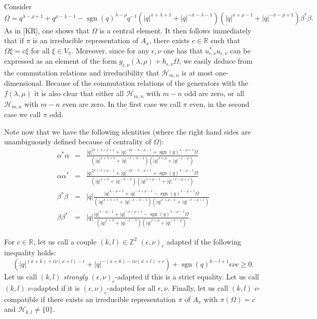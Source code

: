 \documentclass[12pt]{article}
\theoremstyle{change}
\DeclareMathOperator{\sgn}{\mathrm{sgn}}
\newcommand{\R}{\mathbb{R}}
\newcommand{\Z}{\mathbb{Z}}
\newcommand{\Hsp}{\mathscr{H}}
\theoremstyle{definition}
\numberwithin{equation}{section}
\begin{document}
Consider \[\Omega =q^{\lambda-\rho+1}+q^{\rho-\lambda-1} - \sgn(q)^{\lambda-\rho}q^{-1}(|q|^{x+\lambda+1}+|q|^{-x-\lambda-1})(|q|^{x+\rho-1}+|q|^{-x-\rho+1})\beta^*\beta.\] As in [KR], one shows that $\Omega$ is a central element. It then follows immediately that if $\pi$ is an irreducible representation of $A_x$, there exists $c\in \R$ such that $\Omega\xi = c\xi$ for all $\xi \in V_{\pi}$. Moreover, since for any $\epsilon,\nu$ one has that $u_{\epsilon,\nu}^*u_{\epsilon,\nu}$ can be expressed as an element of the form $g_{\epsilon,\nu}(\lambda,\rho) + h_{\epsilon,\nu}\Omega$, we easily deduce from the commutation relations and irreducibility that $\Hsp_{m,n}$ is at most one-dimensional. Because of the commutation relations of the generators with the $f(\lambda,\mu)$ it is also clear that either all $\Hsp_{m,n}$ with $m-n$ odd are zero, or all $\Hsp_{m,n}$ with $m-n$ even are zero. In the first case we call $\pi$ even, in the second case we call $\pi$ odd. 


Note now that we have the following identities (where the right hand sides are unambiguously defined because of centrality of $\Omega$): 
\begin{eqnarray*}
\alpha^*\alpha &=& \frac{|q|^{2x+\lambda+\rho+1}+|q|^{-2x-\lambda-\rho-1}+\sgn(q)^{\lambda-\rho+1}\Omega}{(|q|^{x+\lambda+1}+|q|^{-x-\lambda-1})(|q|^{x+\rho}+|q|^{-x-\rho})}\\
\alpha\alpha^* &=& \frac{|q|^{2x+\lambda+\rho-1}+|q|^{-2x-\lambda-\rho+1}+\sgn(q)^{\lambda-\rho-1}\Omega}{(|q|^{x+\lambda}+|q|^{-x-\lambda})(|q|^{x+\rho-1}+|q|^{-x-\rho+1})}\\
\beta^*\beta &=& |q|\frac{|q|^{\lambda-\rho+1}+|q|^{-\lambda+\rho-1}-\sgn(q)^{\lambda-\rho+1}\Omega}{(|q|^{x+\lambda+1}+|q|^{-x-\lambda-1})(|q|^{x+\rho-1}+|q|^{-x-\rho+1})}\\
\beta\beta^* &=&  |q|\frac{|q|^{\lambda-\rho-1}+|q|^{-\lambda+\rho+1}-\sgn(q)^{\lambda-\rho-1}\Omega}{(|q|^{x+\lambda}+|q|^{-x-\lambda})(|q|^{x+\rho}+|q|^{-x-\rho})}.
\end{eqnarray*}

For $c\in\R$, let us call a couple $(k,l)\in \Z^2$ $(\epsilon,\nu)_c$ adapted if the following inequality holds: \begin{equation}\label{EqAd}(|q|^{(x+k)+\epsilon\nu(x+l)-\epsilon}+|q|^{-(x+k)-\epsilon\nu(x+l)+\epsilon})+\sgn(q)^{k-l+1}\epsilon\nu c\geq 0.\end{equation} Let us call $(k,l)$ \emph{strongly} $(\epsilon,\nu)_c$-adapted if this is a strict equality. Let us call $(k,l)$ $c$-adapted if it is $(\epsilon,\nu)_c$-adapted for all $\epsilon,\nu$. Finally, let us call $(k,l)$ $c$-compatible if there exists an irreducible representation $\pi$ of $A_x$ with $\pi(\Omega) = c$ and $\Hsp_{k,l}\neq \{0\}$. 
\end{document}
